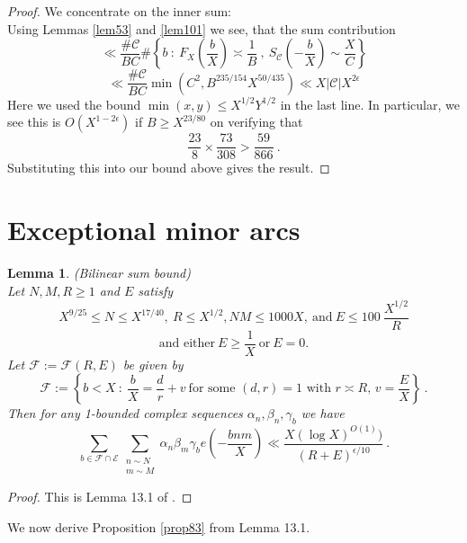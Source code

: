 \documentclass{amsart}
\newtheorem{lemma}[theorem]{Lemma}
\numberwithin{equation}{subsection}
\begin{document}
\begin{proof}
 We concentrate on the inner sum:\\
 Using Lemmas \ref{lem53} and \ref{lem101} we see, that the sum contribution 
 $$\ll \frac{\#\mathcal{C}}{BC} \#\left\{ b\::\: F_X\left(\frac{b}{X}\right)\asymp \frac{1}{B}\:, \ S_{\mathcal{C}}\left(-\frac{b}{X}\right)\sim   \frac{X}{C}\right\}$$ 
 $$\ll \frac{\#\mathcal{C}}{BC}\min\left(C^2, B^{235/154} X^{50/435}\right) \ll X|\mathcal{C}|X^{2\epsilon} $$
Here we used the bound $\min(x, y)\leq X^{1/2}Y^{1/2}$ in the last line. In particular, we see this is $O(X^{1-2\epsilon})$ if $B\geq X^{23/80}$ on verifying that
$$\frac{23}{8}\times\frac{73}{308}>\frac{59}{866}\:.$$
Substituting this into our bound above gives the result.
\end{proof}


\section{Exceptional minor arcs}

\begin{lemma}\label{lem111}(Bilinear sum bound)$ $\\
Let $N, M, R\geq 1$ and $E$ satisfy
$$X^{9/25}\leq N\leq X^{17/40},\ R\leq X^{1/2}, NM\leq 1000X,\ \text{and}\ E\leq 100\:\frac{X^{1/2}}{R}$$
$$\text{and either}\ E\geq \frac{1}{X}\ \text{or}\ E=0.$$
Let $\mathcal{F}:=\mathcal{F}(R, E)$ be given by
$$\mathcal{F}:=\left\{ b<X\::\:\frac{b}{X}=\frac{d}{r}+v\ \text{for some $(d,r)=1$ with $r\asymp R$, $v=\frac{E}{X}$}\right\}\:.$$
Then for any 1-bounded complex sequences $\alpha_n, \beta_n, \gamma_b$ we have
$$\sum_{b\in \mathcal{F}\cap \mathcal{E}} \sum_{\substack{n\sim N \\ m\sim M}} \alpha_n \beta_m \gamma_b e\left(-\frac{bnm}{X}\right) \ll \frac{X(\log X)^{O(1)})}{(R+E)^{\epsilon/10}}\:.$$
\end{lemma}
\begin{proof}
This is Lemma 13.1 of \cite{maynard}.
\end{proof}

We now derive Proposition \ref{prop83} from Lemma 13.1.

\end{document}
